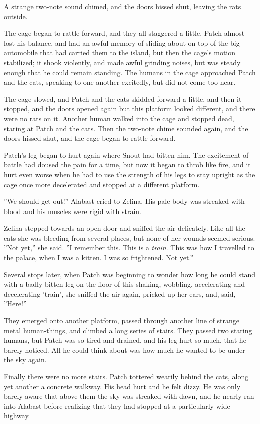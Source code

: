 \documentclass[12pt]{book}
\begin{document}
A strange two-note sound chimed, and the doors hissed shut, leaving the rats outside.

The cage began to rattle forward, and they all staggered a little. Patch almost lost his balance, and had an awful memory of sliding about on top of the big automobile that had carried them to the island, but then the cage's motion stabilized; it shook violently, and made awful grinding noises, but was steady enough that he could remain standing. The humans in the cage approached Patch and the cats, speaking to one another excitedly, but did not come too near.

The cage slowed, and Patch and the cats skidded forward a little, and then it stopped, and the doors opened again %
but this platform looked different, and there were no rats on it. Another human walked into the cage and stopped dead, staring at Patch and the cats. Then the two-note chime sounded again, and the doors hissed shut, and the cage began to rattle forward.

Patch's leg began to hurt again where Snout had bitten him. The excitement of battle had doused the pain for a time, but now it began to throb like fire, and it hurt even worse when he had to use the strength of his legs to stay upright as the cage once more decelerated and stopped at a different platform.

''We should get out!'' Alabast cried to Zelina. His pale body was streaked with blood and his muscles were rigid with strain.

Zelina stepped towards an open door and sniffed the air delicately. Like all the cats she was bleeding from several places, but none of her wounds seemed serious. ''Not yet,'' she said. ''I remember this. This is a {\it train}. This was how I travelled to the palace, when I was a kitten. I was so frightened. Not yet.''

Several stops later, when Patch was beginning to wonder how long he could stand with a badly bitten leg on the floor of this shaking, wobbling, accelerating and decelerating 'train', she sniffed the air again, pricked up her ears, and, said, ''Here!''

They emerged onto another platform, passed through another line of strange metal human-things, and climbed a long series of stairs. They passed two staring humans, but Patch was so tired and drained, and his leg hurt so much, that he barely noticed. All he could think about was how much he wanted to be under the sky again.

Finally there were no more stairs. Patch tottered wearily behind the cats, along yet another a concrete walkway. His head hurt and he felt dizzy. He was only barely aware that above them the sky was streaked with dawn, and he nearly ran into Alabast before realizing that they had stopped at a particularly wide highway.
\end{document}
